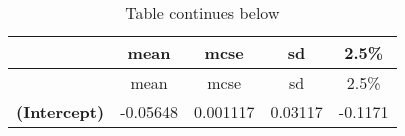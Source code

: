\documentclass[]{article}
\begin{document}
\begin{longtable}[]{@{}ccccc@{}}
\caption{Table continues below}\tabularnewline
\toprule
\begin{minipage}[b]{0.36\columnwidth}\centering\strut
~\strut
\end{minipage} & \begin{minipage}[b]{0.12\columnwidth}\centering\strut
mean\strut
\end{minipage} & \begin{minipage}[b]{0.13\columnwidth}\centering\strut
mcse\strut
\end{minipage} & \begin{minipage}[b]{0.12\columnwidth}\centering\strut
sd\strut
\end{minipage} & \begin{minipage}[b]{0.12\columnwidth}\centering\strut
2.5\%\strut
\end{minipage}\tabularnewline
\midrule
\endfirsthead
\toprule
\begin{minipage}[b]{0.36\columnwidth}\centering\strut
~\strut
\end{minipage} & \begin{minipage}[b]{0.12\columnwidth}\centering\strut
mean\strut
\end{minipage} & \begin{minipage}[b]{0.13\columnwidth}\centering\strut
mcse\strut
\end{minipage} & \begin{minipage}[b]{0.12\columnwidth}\centering\strut
sd\strut
\end{minipage} & \begin{minipage}[b]{0.12\columnwidth}\centering\strut
2.5\%\strut
\end{minipage}\tabularnewline
\midrule
\endhead
\begin{minipage}[t]{0.36\columnwidth}\centering\strut
\textbf{(Intercept)}\strut
\end{minipage} & \begin{minipage}[t]{0.12\columnwidth}\centering\strut
-0.05648\strut
\end{minipage} & \begin{minipage}[t]{0.13\columnwidth}\centering\strut
0.001117\strut
\end{minipage} & \begin{minipage}[t]{0.12\columnwidth}\centering\strut
0.03117\strut
\end{minipage} & \begin{minipage}[t]{0.12\columnwidth}\centering\strut
-0.1171\strut

\end{minipage}
\end{longtable}
\end{document}
